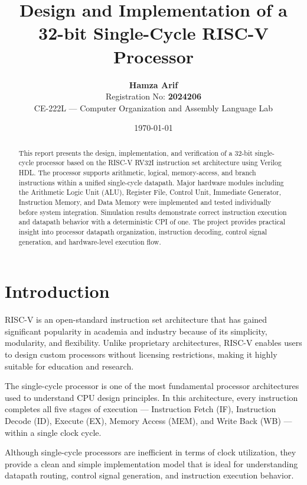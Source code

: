 \documentclass[10pt,a4paper,twocolumn]{article}
\title{
\textbf{Design and Implementation of a 32-bit Single-Cycle RISC-V Processor}
}
\author{
\textbf{Hamza Arif} \\
Registration No: \textbf{2024206} \\
CE-222L --- Computer Organization and Assembly Language Lab
}
\date{\today}
\begin{document}
\maketitle

\begin{abstract}
This report presents the design, implementation, and verification of a 32-bit single-cycle processor based on the RISC-V RV32I instruction set architecture using Verilog HDL. The processor supports arithmetic, logical, memory-access, and branch instructions within a unified single-cycle datapath. Major hardware modules including the Arithmetic Logic Unit (ALU), Register File, Control Unit, Immediate Generator, Instruction Memory, and Data Memory were implemented and tested individually before system integration. Simulation results demonstrate correct instruction execution and datapath behavior with a deterministic CPI of one. The project provides practical insight into processor datapath organization, instruction decoding, control signal generation, and hardware-level execution flow.
\end{abstract}

\section{Introduction}

RISC-V is an open-standard instruction set architecture that has gained significant popularity in academia and industry because of its simplicity, modularity, and flexibility. Unlike proprietary architectures, RISC-V enables users to design custom processors without licensing restrictions, making it highly suitable for education and research.

The single-cycle processor is one of the most fundamental processor architectures used to understand CPU design principles. In this architecture, every instruction completes all five stages of execution --- Instruction Fetch (IF), Instruction Decode (ID), Execute (EX), Memory Access (MEM), and Write Back (WB) --- within a single clock cycle.

Although single-cycle processors are inefficient in terms of clock utilization, they provide a clean and simple implementation model that is ideal for understanding datapath routing, control signal generation, and instruction execution behavior.
\end{document}
